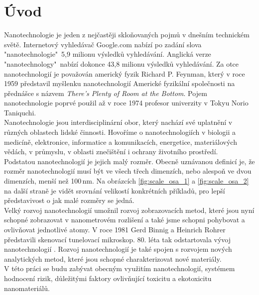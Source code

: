 \chapter{Úvod}

Nanotechnologie je jeden z nejčastěji skloňovaných pojmů v dnešním technickém světě. Internetový vyhledávač Google.com nabízí po zadání slova "nanotechnologie"$\,$ 5,9 milionu výsledků vyhledávání. Anglická verze "nanotechnology"$\,$ nabízí dokonce 43,8 milionu výsledků vyhledávání. Za otce nanotechnologií je považován americký fyzik Richard P. Feynman, který v roce 1959 představil myšlenku nanotechnologií Americké fyzikální společnosti na přednášce s názvem {\it There’s Plenty of Room at the Bottom}. \cite{britanica_nanotechnology} 
Pojem nanotechnologie poprvé použil až v roce 1974 profesor univerzity v Tokyu Norio Taniquchi. \cite{timeline_nanotechnology}\\

Nanotechnologie jsou interdisciplinární obor, který nachází své uplatnění v různých oblastech lidské činnosti. Hovoříme o nanotechnologiích v biologii a medicíně, elektronice, informatice a komunikacích, energetice, materiálových vědách, v průmyslu, v oblasti znečištění i ochrany životního prostředí. \cite{whats_nanotechnology} \\

Podstatou nanotechnologií je jejich malý rozměr. Obecně uznávanou definicí je, že rozměr nanotechnologií musí být ve všech třech dimenzích, nebo alespoň ve dvou dimenzích, menší než 100$\,$nm. Na obrázcích \ref{fig:scale_osa_1} a \ref{fig:scale_osa_2} na další straně je vidět srovnání velikostí konkrétních příkladů, pro lepší představivost o jak malé rozměry se jedná. \\

Velký rozvoj nanotechnologií umožnil rozvoj zobrazovacích metod, které jsou nyní schopné zobrazovat v nanometrovém rozlišení a také jsme schopni pohybovat a ovlivňovat jednotlivé atomy. V roce 1981 Gerd Binnig a Heinrich Rohrer představili skenovací tunelovací mikroskop. 80. léta tak odstartovala vývoj nanotechnologií \cite{timeline_nanotechnology}. Rozvoj nanotechnologií je také spojen s rozvojem nových analytických metod, které jsou schopné charakterizovat nové materiály.\\

V této práci se budu zabývat obecným využitím nanotechnologií, systémem hodnocení rizik, důležitými faktory ovlivňující toxicitu a ekotoxicitu nanomateriálů.


